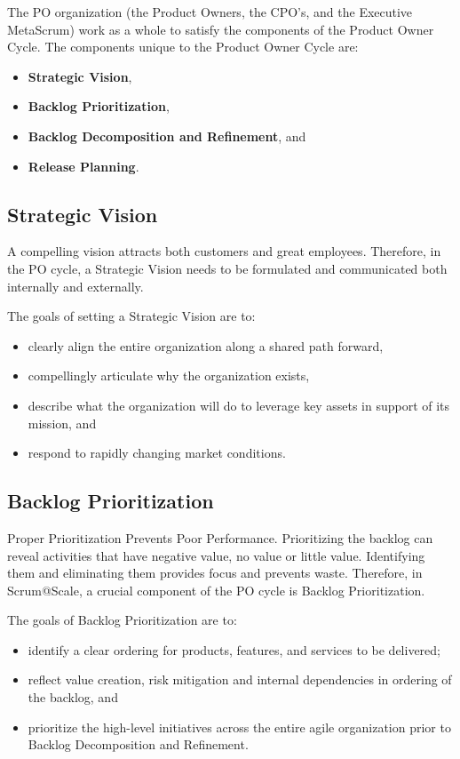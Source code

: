 \documentclass[12pt,a4paper,parskip=full]{scrartcl}
\begin{document}
The PO organization (the Product Owners, the CPO's, and the Executive MetaScrum) work as a whole to satisfy the components of the Product Owner Cycle. The components unique to the Product Owner Cycle are:
\begin{itemize}
	\item \textbf{Strategic Vision},
	\item \textbf{Backlog Prioritization},
	\item \textbf{Backlog Decomposition and Refinement}, and
	\item \textbf{Release Planning}.
\end{itemize}

\subsection{Strategic Vision}

A compelling vision attracts both customers and great employees.
Therefore, in the PO cycle, a Strategic Vision needs to be formulated and communicated both internally and externally.

The goals of setting a Strategic Vision are to:

\begin{itemize}
	\item clearly align the entire organization along a shared path forward,
	\item compellingly articulate why the organization exists,
	\item describe what the organization will do to leverage key assets in support of its mission, and
	\item respond to rapidly changing market conditions.
\end{itemize}

\subsection{Backlog Prioritization}

Proper Prioritization Prevents Poor Performance.
Prioritizing the backlog can reveal activities that have negative value, no value or little value.
Identifying them and eliminating them provides focus and prevents waste.
Therefore, in Scrum@Scale, a crucial component of the PO cycle is Backlog Prioritization.

The goals of Backlog Prioritization are to:

\begin{itemize}
	\item identify a clear ordering for products, features, and services to be delivered;
	\item reflect value creation, risk mitigation and internal dependencies in ordering of the backlog, and
	\item prioritize the high-level initiatives across the entire agile organization prior to Backlog Decomposition and Refinement.
\end{itemize}
\end{document}
